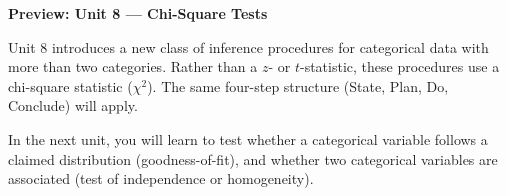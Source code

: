 \documentclass[10pt]{article}
\begin{document}
\begin{reflectionbox}
\textbf{Preview: Unit 8 --- Chi-Square Tests}

Unit 8 introduces a new class of inference procedures for categorical data with more than two
categories. Rather than a $z$- or $t$-statistic, these procedures use a chi-square statistic
($\chi^2$). The same four-step structure (State, Plan, Do, Conclude) will apply.

In the next unit, you will learn to test whether a categorical variable follows a claimed
distribution (goodness-of-fit), and whether two categorical variables are associated
(test of independence or homogeneity).
\end{reflectionbox}
\end{document}
